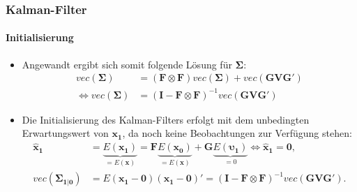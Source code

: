 \documentclass{beamer} %
\begin{document}
\begin{frame}\frametitle{Kalman-Filter}\framesubtitle{Initialisierung}
  \begin{itemize}
        \item Angewandt ergibt sich somit folgende L\"{o}sung f\"{u}r $\boldsymbol{\Sigma}$:
\begin{align*}
    vec(\boldsymbol{\Sigma}) &= (\mathbf{F} \otimes \mathbf{F} ) vec(\boldsymbol{\Sigma}) + vec(\mathbf{G} \mathbf{V} \mathbf{G}')\\
\Leftrightarrow    vec(\boldsymbol{\Sigma}) &= (\mathbf{I}-\mathbf{F} \otimes \mathbf{F})^{-1} vec(\mathbf{G} \mathbf{V} \mathbf{G}')
\end{align*}
\item Die Initialisierung des Kalman-Filters erfolgt mit dem unbedingten Erwartungswert von $\mathbf{x_1}$, da noch keine Beobachtungen zur Verf\"{u}gung
stehen:
\begin{align*}
\mathbf{\widehat{x}_1} &= \underbrace{E(\mathbf{x_1})}_{=E(\mathbf{x})} = \mathbf{F }\underbrace{E(\mathbf{x_0})}_{=E(\mathbf{x})} + \mathbf{G}\underbrace{E(\boldsymbol{\upsilon_1})}_{=0} \Leftrightarrow \mathbf{\widehat{x}_1} = \mathbf{0},\\
vec(\boldsymbol{\Sigma_{1|0}}) & = E(\mathbf{x_1}-\textbf{0})(\mathbf{x_1}-\textbf{0})'=(\mathbf{I}-\mathbf{F} \otimes \mathbf{F})^{-1} vec(\mathbf{G} \mathbf{V} \mathbf{G}').
\end{align*}

  \end{itemize}
\end{frame}
\end{document}

